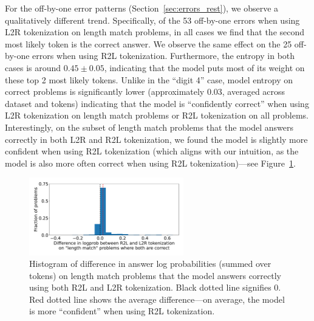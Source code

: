 \documentclass{article}
\theoremstyle{plain}
\theoremstyle{definition}
\theoremstyle{remark}
\begin{document}
For the off-by-one error patterns (Section~\ref{sec:errors_rest}), we observe a qualitatively different trend. Specifically, of the 53 off-by-one errors when using L2R tokenization on length match problems, in all cases we find that the second most likely token is the correct answer. We observe the same effect on the 25 off-by-one errors when using R2L tokenization. Furthermore, the entropy in both cases is around $0.45 \pm 0.05$, indicating that the model puts most of its weight on these top 2 most likely tokens. Unlike in the ``digit 4'' case, model entropy on correct problems is significantly lower (approximately 0.03, averaged across dataset and tokens) indicating that the model is ``confidently correct'' when using L2R tokenization on length match problems or R2L tokenization on all problems. Interestingly, on the subset of length match problems that the model answers correctly in both L2R and R2L tokenization, we found the model is slightly more confident when using R2L tokenization (which aligns with our intuition, as the model is also more often correct when using R2L tokenization)---see Figure~\ref{fig:correct_logprob_hist}.

\begin{figure}
    \centering
    \includegraphics[width=0.6\textwidth]{figures/correct_logprob_diff_across_tokenization.pdf}
    \vspace{-2em}
    \caption{Histogram of difference in answer log probabilities (summed over tokens) on length match problems that the model answers correctly using both R2L and L2R tokenization. Black dotted line signifies 0. Red dotted line shows the average difference---on average, the model is more ``confident'' when using R2L tokenization.}
    \label{fig:correct_logprob_hist}
\end{figure}
\end{document}
